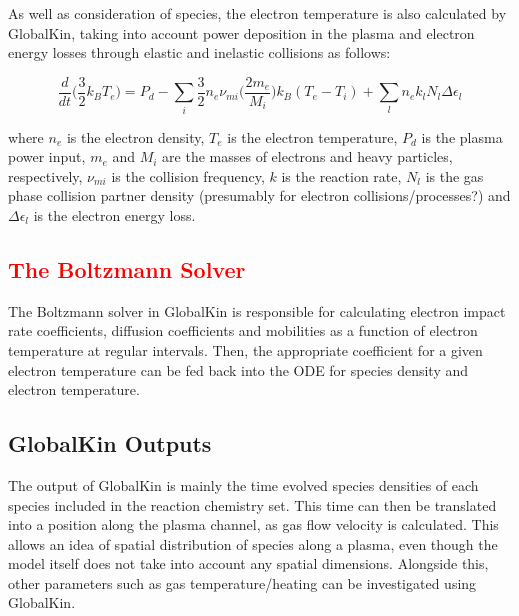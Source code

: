 \documentclass[11pt, oneside]{article}   	%
\begin{document}
As well as consideration of species, the electron temperature is also calculated by GlobalKin, taking into account power deposition in the plasma and electron energy losses through elastic and inelastic collisions as follows:

\begin{equation}
\frac{d}{dt}\Big(\frac{3}{2}k_BT_e\Big) = P_d - \sum_i\frac{3}{2}n_e\nu_{mi}\Big(\frac{2m_e}{M_i}\Big)k_B(T_e - T_i) + \sum_l n_ek_lN_l\Delta\epsilon_l
\label{ElectronTempEqn}
\end{equation}

where $n_e$ is the electron density, $T_e$ is the electron temperature, $P_d$ is the plasma power input, $m_e$ and $M_i$ are the masses of electrons and heavy particles, respectively, $\nu_{mi}$ is the collision frequency, $k$ is the reaction rate, $N_l$ is the gas phase collision partner density (presumably for electron collisions/processes?) and $\Delta\epsilon_l$ is the electron energy loss.

\subsection{\textcolor{red}{The Boltzmann Solver}}


The Boltzmann solver in GlobalKin is responsible for calculating electron impact rate coefficients, diffusion coefficients and mobilities as a function of electron temperature at regular intervals.
Then, the appropriate coefficient for a given electron temperature can be fed back into the ODE for species density and electron temperature.


\subsection{GlobalKin Outputs}
The output of GlobalKin is mainly the time evolved species densities of each species included in the reaction chemistry set.
This time can then be translated into a position along the plasma channel, as gas flow velocity is calculated.
This allows an idea of spatial distribution of species along a plasma, even though the model itself does not take into account any spatial dimensions. Alongside this, other parameters such as gas temperature/heating can be investigated using GlobalKin.
\end{document}
